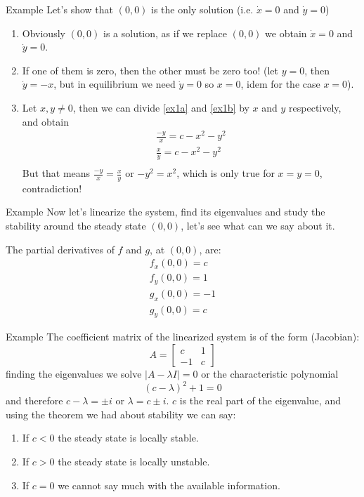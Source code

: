 \documentclass[aspectratio=169, handout]{beamer}
\begin{document}
\begin{frame}{Example}
    Let's show that $(0,0)$ is the only solution (i.e. $\dot{x}=0$ and $\dot{y}=0$)
    \begin{enumerate}
        \item Obviously $(0,0)$ is a solution, as if we replace $(0,0)$ we obtain $\dot{x}=0$ and $\dot{y}=0$.
        \item If one of them is zero, then the other must be zero too! (let $y=0$, then $\dot{y}=-x$, but in equilibrium we need $\dot{y}=0$ so $x=0$, idem for the case $x=0$).
        \item Let $x,y\neq0$, then we can divide \eqref{ex1a} and \eqref{ex1b} by $x$ and $y$ respectively, and obtain
        \begin{align*}
            \frac{-y}{x}=c-x^2-y^2\\
            \frac{x}{y}=c-x^2-y^2\\
        \end{align*}
        But that means $\frac{-y}{x}=\frac{x}{y}$ or $-y^2=x^2$, which is only true for $x=y=0$, contradiction!
    \end{enumerate}
\end{frame}
\begin{frame}{Example}
    Now let's linearize the system, find its eigenvalues and study the stability around the steady state $(0,0)$, let's see what can we say about it.
    
    \pause
    
    The partial derivatives of $f$ and $g$, at $(0,0)$, are:
    \begin{align*}
        f_x(0,0)=c\\
        f_y(0,0)=1\\
        g_x(0,0)=-1\\
        g_y(0,0)=c
    \end{align*}
    
\end{frame}

\begin{frame}{Example}
    The coefficient matrix of the linearized system is of the form (Jacobian): \[A=\begin{bmatrix}c&1\\-1&c\end{bmatrix}\] finding the eigenvalues we solve \(|A-\lambda I|=0\) or the characteristic polynomial \[(c-\lambda)^2+1=0\] and therefore $c-\lambda = \pm i$ or $\lambda = c\pm i$. $c$ is the real part of the eigenvalue, and using the theorem we had about stability we can say:
    \begin{enumerate}
        \item If $c<0$ the steady state is locally stable.
        \item If $c>0$ the steady state is locally unstable.
        \item If $c=0$ we cannot say much with the available information.
    \end{enumerate}
\end{frame}
\end{document}
